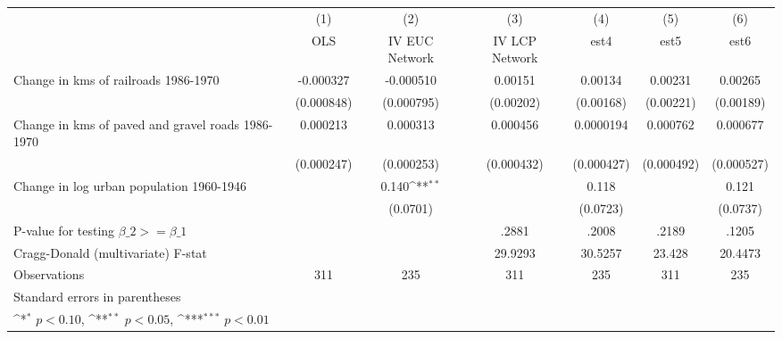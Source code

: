 {
\def\sym#1{\ifmmode^{#1}\else\(^{#1}\)\fi}
\begin{tabular}{l*{6}{c}}
\hline\hline
                &\multicolumn{1}{c}{(1)}&\multicolumn{1}{c}{(2)}&\multicolumn{1}{c}{(3)}&\multicolumn{1}{c}{(4)}&\multicolumn{1}{c}{(5)}&\multicolumn{1}{c}{(6)}\\
                &\multicolumn{1}{c}{OLS}&\multicolumn{1}{c}{IV EUC Network}&\multicolumn{1}{c}{IV LCP Network}&\multicolumn{1}{c}{est4}&\multicolumn{1}{c}{est5}&\multicolumn{1}{c}{est6}\\
\hline
Change in kms of railroads 1986-1970&-0.000327         &-0.000510         &  0.00151         &  0.00134         &  0.00231         &  0.00265         \\
                &(0.000848)         &(0.000795)         &(0.00202)         &(0.00168)         &(0.00221)         &(0.00189)         \\
[1em]
Change in kms of paved and gravel roads 1986-1970& 0.000213         & 0.000313         & 0.000456         &0.0000194         & 0.000762         & 0.000677         \\
                &(0.000247)         &(0.000253)         &(0.000432)         &(0.000427)         &(0.000492)         &(0.000527)         \\
[1em]
Change in log urban population 1960-1946&                  &    0.140\sym{**} &                  &    0.118         &                  &    0.121         \\
                &                  & (0.0701)         &                  & (0.0723)         &                  & (0.0737)         \\
\hline
P-value for testing $\beta\_{2} >= \beta\_{1}$&                  &                  &    .2881         &    .2008         &    .2189         &    .1205         \\
Cragg-Donald (multivariate) F-stat&                  &                  &  29.9293         &  30.5257         &   23.428         &  20.4473         \\
Observations    &      311         &      235         &      311         &      235         &      311         &      235         \\
\hline\hline
\multicolumn{7}{l}{\footnotesize Standard errors in parentheses}\\
\multicolumn{7}{l}{\footnotesize \sym{*} \(p<0.10\), \sym{**} \(p<0.05\), \sym{***} \(p<0.01\)}\\
\end{tabular}
}
